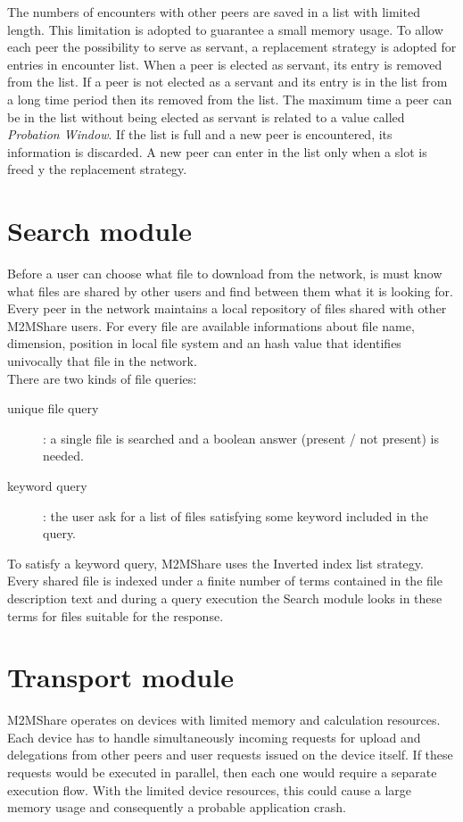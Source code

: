 The numbers of encounters with other peers are saved in a list with limited length. This limitation is adopted to guarantee a small memory usage. To allow each peer the possibility to serve as servant, a replacement strategy is adopted for entries in encounter list. When a peer is elected as servant, its entry is removed from the list. If a peer is not elected as a servant and its entry is in the list from a long time period then its removed from the list. The maximum time a peer can be in the list without being elected as servant is related to a value called \textit{Probation Window}. If the list is full and a new peer is encountered, its information is discarded. A new peer can enter in the list only when a slot is freed y the replacement strategy.

\section{Search module}
Before a user can choose what file to download from the network, is must know what files are shared by other users and find between them what it is looking for. Every peer in the network maintains a local repository of files shared with other M2MShare users. For every file are available informations about file name, dimension, position in local file system and an hash value that identifies univocally that file in the network.
\\

There are two kinds of file queries: 

\begin{description}
\item[unique file query]: a single file is searched and a boolean answer (present / not present) is needed.
\item[keyword query]: the user ask for a list of files satisfying some keyword included in the query.
\end{description}

To satisfy a keyword query, M2MShare uses the Inverted index list strategy. Every shared file is indexed under a finite number of terms contained in the file description text and during a query execution the Search module looks in these terms for files suitable for the response.


\section{Transport module}
M2MShare operates on devices with limited memory and calculation resources. Each device has to handle simultaneously incoming requests for upload and delegations from other peers and user requests issued on the device itself. If these requests would be executed in parallel, then each one would require a separate execution flow. With the limited device resources, this could cause a large memory usage and consequently a probable application crash. 
\\

